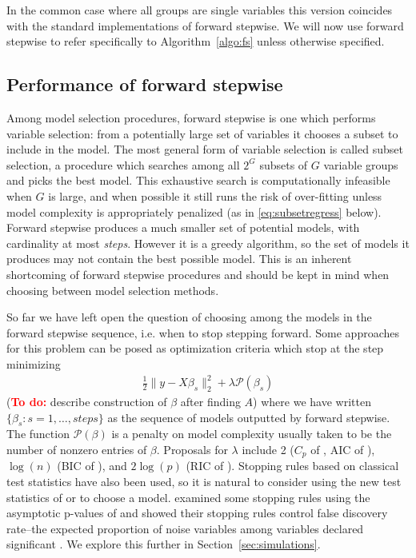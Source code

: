 \documentclass{imsart}
\newcommand{\todo}{\textcolor{red}{\textbf{To do: }}}
\newcommand{\pen}{\mathcal{P}}
\begin{document}
In the common case where all groups are single variables this version
coincides with the standard implementations of forward stepwise.
We will now use forward stepwise to refer specifically to
Algorithm~\ref{algo:fs} unless otherwise specified.

\subsection{Performance of forward stepwise}

Among model selection procedures, forward stepwise is one which performs
variable selection: from a potentially large set of variables it chooses
a subset to include in the model. The most general form of variable
selection is called subset selection, a procedure which searches among
all $2^G$ subsets of $G$ variable groups and picks the best model.
This exhaustive search is computationally infeasible when $G$ is
large, and when possible it still
runs the risk of over-fitting unless model complexity is
appropriately penalized (as in \eqref{eq:subsetregress} below).
Forward stepwise produces a much
smaller set of potential models, with cardinality at most
\textit{steps}. However
it is a greedy algorithm, so the set of models it produces may not
contain the best possible model. This is an inherent shortcoming of
forward stepwise procedures and should be kept in mind when choosing
between model selection methods.

So far we have left open the question of choosing among the models in
the forward stepwise sequence, i.e. when to stop stepping
forward. Some approaches for this problem can be posed as optimization
criteria which stop at the step minimizing
\begin{equation}
\begin{aligned}
\label{eq:subsetregress}
\frac{1}{2} \| y - X \beta_s \|_2^2 + \lambda \pen(\beta_s)
\end{aligned}
\end{equation}
(\todo describe construction of $\beta$ after finding $A$)
where we have written $\{ \beta_s : s = 1, \ldots, steps \}$ as
the sequence of models outputted by forward stepwise. The function
$\pen(\beta)$ is a penalty on model complexity usually taken to be the
number of nonzero entries of $\beta$. Proposals for $\lambda$ include
2 ($C_p$ of \cite{CP}, AIC of \cite{AIC}), $\log(n)$ (BIC of \cite{BIC}), and
$2\log(p)$ (RIC of \cite{RIC}). Stopping rules based on classical test
statistics have also been used, so it is natural to consider using
the new test statistics of \cite{significance:lasso} or
\cite{tests:adaptive}
to choose a model. \cite{sequential:fdr} examined some stopping rules
using the asymptotic p-values of \cite{significance:lasso} and showed
their stopping rules control false discovery rate--the expected
proportion of noise variables among variables declared significant
\citep{fdr}. We explore this further in Section~\ref{sec:simulations}.
\end{document}
